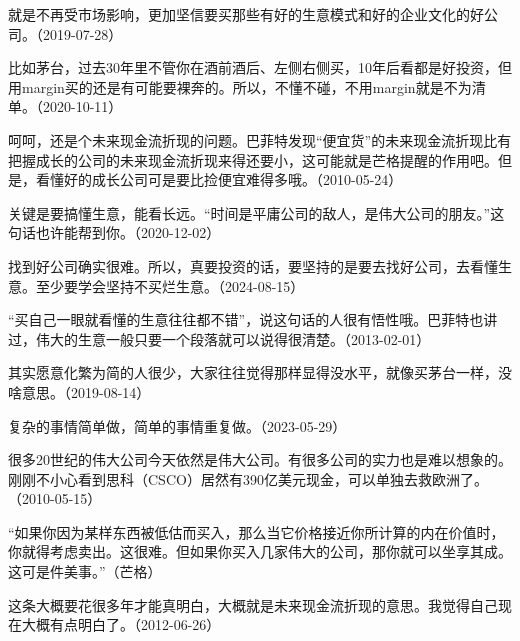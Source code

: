 
就是不再受市场影响，更加坚信要买那些有好的生意模式和好的企业文化的好公司。（2019-07-28）

比如茅台，过去30年里不管你在酒前酒后、左侧右侧买，10年后看都是好投资，但用margin买的还是有可能要裸奔的。所以，不懂不碰，不用margin就是不为清单。（2020-10-11）


呵呵，还是个未来现金流折现的问题。巴菲特发现“便宜货”的未来现金流折现比有把握成长的公司的未来现金流折现来得还要小，这可能就是芒格提醒的作用吧。但是，看懂好的成长公司可是要比捡便宜难得多哦。（2010-05-24）


关键是要搞懂生意，能看长远。“时间是平庸公司的敌人，是伟大公司的朋友。”这句话也许能帮到你。（2020-12-02）

找到好公司确实很难。所以，真要投资的话，要坚持的是要去找好公司，去看懂生意。至少要学会坚持不买烂生意。（2024-08-15）

“买自己一眼就看懂的生意往往都不错”，说这句话的人很有悟性哦。巴菲特也讲过，伟大的生意一般只要一个段落就可以说得很清楚。（2013-02-01）

其实愿意化繁为简的人很少，大家往往觉得那样显得没水平，就像买茅台一样，没啥意思。（2019-08-14）

复杂的事情简单做，简单的事情重复做。（2023-05-29）


很多20世纪的伟大公司今天依然是伟大公司。有很多公司的实力也是难以想象的。刚刚不小心看到思科（CSCO）居然有390亿美元现金，可以单独去救欧洲了。（2010-05-15）

“如果你因为某样东西被低估而买入，那么当它价格接近你所计算的内在价值时，你就得考虑卖出。这很难。但如果你买入几家伟大的公司，那你就可以坐享其成。这可是件美事。”（芒格）

这条大概要花很多年才能真明白，大概就是未来现金流折现的意思。我觉得自己现在大概有点明白了。（2012-06-26）


